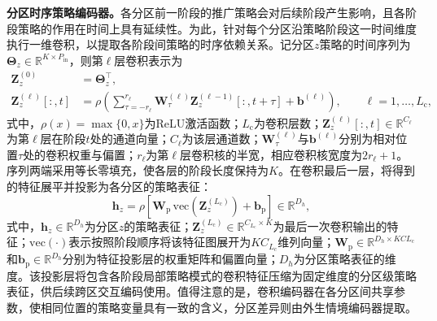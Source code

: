\textbf{分区时序策略编码器。}各分区前一阶段的推广策略会对后续阶段产生影响，且各阶段策略的作用在时间上具有延续性。为此，针对每个分区沿策略阶段这一时间维度执行一维卷积，以提取各阶段间策略的时序依赖关系。记分区$z$策略的时间序列为$\bm{\Theta}_{z}\in\mathbb{R}^{K\times P_{\mathrm{in}}}$，则第$\ell$层卷积表示为
\begin{equation}
\begin{aligned}
\bm{Z}_{z}^{(0)}&=\bm{\Theta}_{z}^{\top},\\
\bm{Z}_{z}^{(\ell)}\left[:,t\right]
&=\rho\left(
\sum_{\tau=-r_{\ell}}^{r_{\ell}}
\bm{W}_{\tau}^{(\ell)}
\bm{Z}_{z}^{(\ell-1)}\left[:,t+\tau\right]
+\bm{b}^{(\ell)}
\right),\qquad
\ell=1,\ldots,L_{\mathrm{c}},
\end{aligned}
\label{eq.opt.cnn}
\end{equation}
式中，$\rho(x)=\max\{0,x\}$为ReLU激活函数；$L_{\mathrm{c}}$为卷积层数；$\bm{Z}_{z}^{(\ell)}[:,t]\in\mathbb{R}^{C_{\ell}}$为第$\ell$层在阶段$t$处的通道向量；$C_{\ell}$为该层通道数；$\bm{W}_{\tau}^{(\ell)}$与$\bm{b}^{(\ell)}$分别为相对位置$\tau$处的卷积权重与偏置；$r_{\ell}$为第$\ell$层卷积核的半宽，相应卷积核宽度为$2r_{\ell}+1$。序列两端采用等长零填充，使各层的阶段长度保持为$K$。在卷积最后一层，将得到的特征展平并投影为各分区的策略表征：
\begin{equation}
\bm{h}_{z}
=\rho\left[
\bm{W}_{\mathrm{p}}\,
\mathrm{vec}\left(\bm{Z}_{z}^{(L_{\mathrm{c}})}\right)
+\bm{b}_{\mathrm{p}}
\right]\in\mathbb{R}^{D_{h}},
\label{eq.opt.cnnproj}
\end{equation}
式中，$\bm{h}_{z}\in\mathbb{R}^{D_h}$为分区$z$的策略表征；$\bm{Z}_{z}^{(L_{\mathrm{c}})}\in\mathbb{R}^{C_{L_{\mathrm{c}}}\times K}$为最后一次卷积输出的特征；$\mathrm{vec}(\cdot)$表示按照阶段顺序将该特征图展开为$K C_{L_c}$维列向量；$\bm{W}_{\mathrm{p}}\in\mathbb{R}^{D_h\times KC{L_{\mathrm{c}}}}$和$\bm{b}_{\mathrm{p}}\in\mathbb{R}^{D_h}$分别为特征投影层的权重矩阵和偏置向量；$D_h$为分区策略表征的维度。该投影层将包含各阶段局部策略模式的卷积特征压缩为固定维度的分区级策略表征，供后续跨区交互编码使用。值得注意的是，卷积编码器在各分区间共享参数，使相同位置的策略变量具有一致的含义，分区差异则由外生情境编码器提取。

